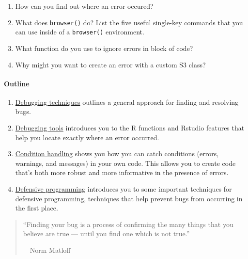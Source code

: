\begin{enumerate}
\def\labelenumi{\arabic{enumi}.}
\item
  How can you find out where an error occured?
\item
  What does \texttt{browser()} do? List the five useful single-key
  commands that you can use inside of a \texttt{browser()} environment.
\item
  What function do you use to ignore errors in block of code?
\item
  Why might you want to create an error with a custom S3 class?
\end{enumerate}

\paragraph{Outline}

\begin{enumerate}
\def\labelenumi{\arabic{enumi}.}
\item
  \hyperref[debugging-techniques]{Debugging techniques} outlines a
  general approach for finding and resolving bugs.
\item
  \hyperref[debugging-tools]{Debugging tools} introduces you to the R
  functions and Rstudio features that help you locate exactly where an
  error occurred.
\item
  \hyperref[condition-handling]{Condition handling} shows you how you
  can catch conditions (errors, warnings, and messages) in your own
  code. This allows you to create code that's both more robust and more
  informative in the presence of errors.
\item
  \hyperref[defensive-programming]{Defensive programming} introduces you
  to some important techniques for defensive programming, techniques
  that help prevent bugs from occurring in the first place.
\end{enumerate}


\begin{quote}
``Finding your bug is a process of confirming the many things that you
believe are true --- until you find one which is not true.''

---Norm Matloff
\end{quote}

